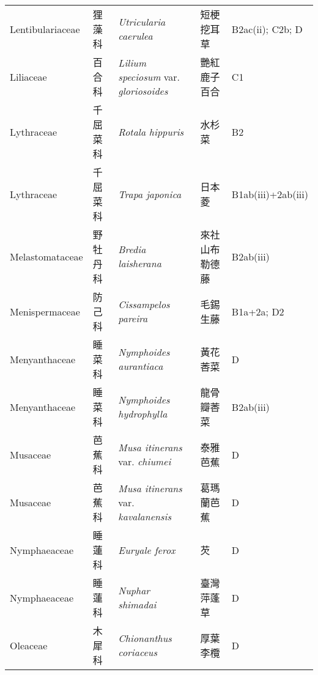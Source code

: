 {\begin{longtable}{p{2.5cm}p{2.5cm}p{4.5cm}p{2.5cm}p{3cm}}
    Lentibulariaceae & 狸藻科 & \textit{Utricularia caerulea}  & 短梗挖耳草 & B2ac(ii); C2b; D \index{Utricularia@\textit{Utricularia}!caerulea@\textit{caerulea}}  \index{短梗挖耳草} \\
    Liliaceae & 百合科 & \textit{Lilium speciosum} var. \textit{gloriosoides}  & 艷紅鹿子百合 & C1 \index{Lilium@\textit{Lilium}!speciosum@\textit{speciosum}!var. gloriosoides@var. \textit{gloriosoides}}  \index{艷紅鹿子百合} \\
    Lythraceae & 千屈菜科 & \textit{Rotala hippuris}  & 水杉菜 & B2 \index{Rotala@\textit{Rotala}!hippuris@\textit{hippuris}}  \index{水杉菜} \\
    Lythraceae & 千屈菜科 & \textit{Trapa japonica}  & 日本菱 & B1ab(iii)+2ab(iii) \index{Trapa@\textit{Trapa}!japonica@\textit{japonica}}  \index{日本菱} \\
    Melastomataceae & 野牡丹科 & \textit{Bredia laisherana}  & 來社山布勒德藤 & B2ab(iii) \index{Bredia@\textit{Bredia}!laisherana@\textit{laisherana}}  \index{來社山布勒德藤} \\
    Menispermaceae & 防己科 & \textit{Cissampelos pareira}  & 毛錫生藤 & B1a+2a; D2 \index{Cissampelos@\textit{Cissampelos}!pareira@\textit{pareira}}  \index{毛錫生藤} \\
    Menyanthaceae & 睡菜科 & \textit{Nymphoides aurantiaca}  & 黃花莕菜 & D \index{Nymphoides@\textit{Nymphoides}!aurantiaca@\textit{aurantiaca}}  \index{黃花莕菜} \\
    Menyanthaceae & 睡菜科 & \textit{Nymphoides hydrophylla}  & 龍骨瓣莕菜 & B2ab(iii) \index{Nymphoides@\textit{Nymphoides}!hydrophylla@\textit{hydrophylla}}  \index{龍骨瓣莕菜} \\
    Musaceae & 芭蕉科 & \textit{Musa itinerans} var. \textit{chiumei}  & 泰雅芭蕉 & D \index{Musa@\textit{Musa}!itinerans@\textit{itinerans}!var. chiumei@var. \textit{chiumei}}  \index{泰雅芭蕉} \\
    Musaceae & 芭蕉科 & \textit{Musa itinerans} var. \textit{kavalanensis}  & 葛瑪蘭芭蕉 & D \index{Musa@\textit{Musa}!itinerans@\textit{itinerans}!var. kavalanensis@var. \textit{kavalanensis}}  \index{葛瑪蘭芭蕉} \\
    Nymphaeaceae & 睡蓮科 & \textit{Euryale ferox}  & 芡 & D \index{Euryale@\textit{Euryale}!ferox@\textit{ferox}}  \index{芡} \\
    Nymphaeaceae & 睡蓮科 & \textit{Nuphar shimadai}  & 臺灣萍蓬草 & D \index{Nuphar@\textit{Nuphar}!shimadai@\textit{shimadai}}  \index{臺灣萍蓬草} \\
    Oleaceae & 木犀科 & \textit{Chionanthus coriaceus}  & 厚葉李欖 & D \index{Chionanthus@\textit{Chionanthus}!coriaceus@\textit{coriaceus}}  \index{厚葉李欖} \\

\end{longtable}}
